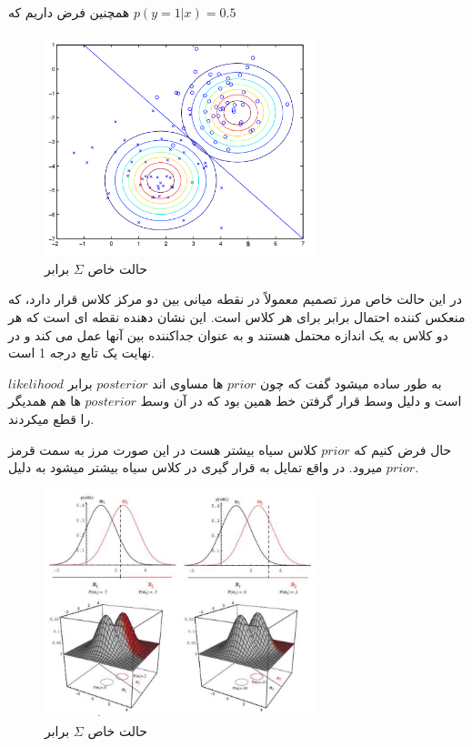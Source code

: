 \documentclass[12pt]{article}
\begin{document}
همچنین فرض داریم که $p(y=1|x) = 0.5$

\begin{figure}[h]
  \centering
  \includegraphics[width=0.7\textwidth]{figs/3.png}
  \caption{حالت خاص $\Sigma$ برابر}
  \label{3}
\end{figure}

در این حالت خاص مرز تصمیم معمولاً در نقطه میانی بین دو مرکز کلاس قرار دارد، که منعکس کننده احتمال برابر برای هر کلاس است. این نشان دهنده نقطه ای است که هر دو کلاس به یک اندازه محتمل هستند و به عنوان جداکننده بین آنها عمل می کند و در نهایت یک تابع درجه 1 است.

به طور ساده میشود گفت که چون $prior$ ها مساوی اند $posterior$ برابر $likelihood$ است و دلیل وسط قرار گرفتن خط همین بود که در آن وسط $posterior$ ها هم همدیگر را قطع میکردند.



حال فرض کنیم که $prior$ کلاس سیاه بیشتر هست در این صورت مرز به سمت قرمز میرود. در واقع تمایل به قرار گیری در کلاس سیاه بیشتر میشود به دلیل $prior$.

\newpage
\begin{figure}[h]
  \centering
  \includegraphics[width=0.7\textwidth]{figs/4.png}
  \caption{حالت خاص $\Sigma$ برابر}
  \label{4}
\end{figure} 
\end{document}
